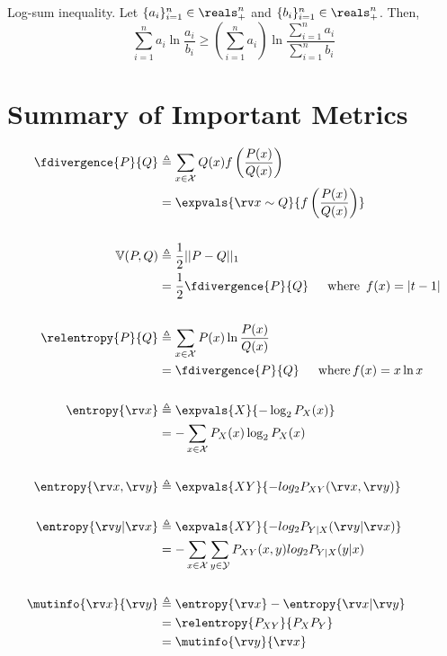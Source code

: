 \documentclass[11pt]{article}
\begin{document}
\begin{lemma} Log-sum inequality. 
  Let $\{a_i\}_{i=1}^n \in \reals_+^n$ and $\{b_i\}_{i=1}^n \in \reals_+^n$. Then,
  \begin{equation}
    \sum_{i=1}^{n} a_i \ln \frac{a_i}{b_i} \geq \left(\sum_{i=1}^{n} a_i\right)
      \ln \frac{\sum_{i=1}^{n} a_i}{\sum_{i=1}^{n} b_i}
  \end{equation}
\end{lemma}

\newpage
\appendix

\section{Summary of Important Metrics}
\begin{equation*}
  \begin{aligned}
    \fdivergence{P}{Q} &\triangleq \sum_{x\in\xalph} Q(x)f\left(\frac{P(x)}{Q(x)}\right)\\
      &= \expvals{\rv x\sim Q}{f\left(\frac{P(x)}{Q(x)}\right)}\\ 
    \\
    \mathbb{V}(P,Q) &\triangleq \frac{1}{2} ||P-Q||_1 \\
      &= \frac{1}{2}\fdivergence{P}{Q} \hspace{1.5em} \mathrm{where} \,\ f(x) = |t-1|\\
    \\
    \relentropy{P}{Q} &\triangleq \sum_{x\in\xalph}P(x)\ln\frac{P(x)}{Q(x)} \\
      &= \fdivergence{P}{Q} \hspace{1.5em} \mathrm{where} \, f(x) = x \ln x \\
    \\
    \entropy{\rv x} &\triangleq \expvals{X}{-\log_2 P_X(x)} \\
      &= -\sum_{x\in\xalph} P_X(x) \log_2 P_X(x) \\
    \\
    \entropy{\rv x, \rv y} &\triangleq \expvals{XY}{-log_2 P_{XY}(\rv x, \rv y)} \\ 
    \\
    \entropy{\rv y | \rv x} &\triangleq \expvals{XY}{-log_2 P_{Y|X}(\rv y | \rv x)} \\
      &= - \sum_{x\in\xalph}\sum_{y\in\yalph}P_{XY}(x,y)log_2 P_{Y|X}(y|x)\\
    \\
    \mutinfo{\rv x}{\rv y} &\triangleq \entropy{\rv x} - \entropy{\rv x|\rv y} \\
      &= \relentropy{P_{XY}}{P_X P_Y} \\
      &= \mutinfo{\rv y}{\rv x}\\
  \end{aligned}
\end{equation*}
\end{document}
